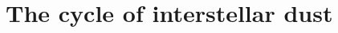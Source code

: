 \begin{frame}\frametitle{}


\vspace{-1cm}
\begin{center}
\end{center}

\end{frame}

\section{The cycle of interstellar dust}

